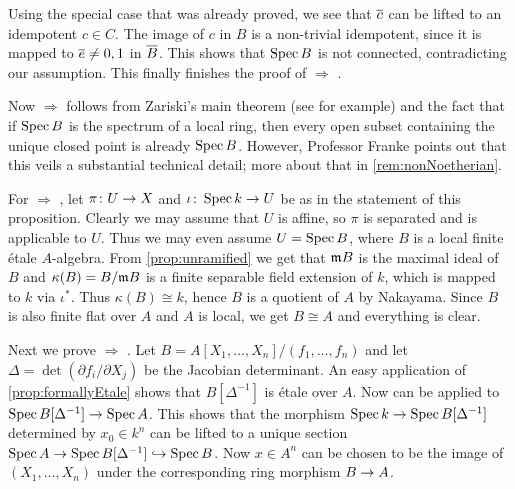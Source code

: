 	Using the special case that was already proved, we see that $\ov{c}$ can be lifted to an idempotent $c\in C$. The image of $c$ in $B$ is a non-trivial idempotent, since it is mapped to $\ov{e}\neq 0,1$ in $\ov{B}$. This shows that $\operatorname{Spec} B$ is not connected, contradicting our assumption. This finally finishes the proof of  $\Rightarrow$ .
	
	Now  $\Rightarrow$  follows from Zariski's main theorem (see \cite[Theorem~2]{jacobians} for example) and the fact that if $\operatorname{Spec} B$ is the spectrum of a local ring, then every open subset containing the unique closed point is already $\operatorname{Spec} B$. However, Professor Franke points out that this  veils a substantial technical detail; more about that in \cref{rem:nonNoetherian}.
	
	For  $\Rightarrow$ , let $\pi\colon U\morphism X$ and $\iota\colon\Spec k\morphism U$ be as in the statement of this proposition. Clearly we may assume that $U$ is affine, so $\pi$ is separated and  is applicable to $U$. Thus we may even assume $U=\operatorname{Spec} B$, where $B$ is a local finite étale $A$-algebra. From \cref{prop:unramified} we get that $\mathfrak{m} B$ is the maximal ideal of $B$ and $\kappa(B)=B/\mathfrak{m} B$ is a finite separable field extension of $k$, which is mapped to $k$ via $\iota^*$. Thus $\kappa(B)\cong k$, hence $B$ is a quotient of $A$ by Nakayama. Since $B$ is also finite flat over $A$ and $A$ is local, we get $B\cong A$ and everything is clear.
	
	Next we prove  $\Rightarrow$ . Let $B=A[X_1,\dotsc,X_n]/(f_1,\dotsc,f_n)$ and let $\Delta=\det(\partial f_i/\partial X_j)$ be the Jacobian determinant. An easy application of \cref{prop:formallyEtale} shows that $B[\Delta^{-1}]$ is étale over $A$. Now  can be applied to $\Spec B[\Delta^{-1}]\morphism \Spec A$. This shows that the morphism $\Spec k\morphism \Spec B[\Delta^{-1}]$ determined by $x_0\in k^n$ can be lifted to a unique section $\Spec A\morphism \Spec B[\Delta^{-1}]\monomorphism \Spec B$. Now $x\in A^n$ can be chosen to be the image of $(X_1,\dotsc,X_n)$ under the corresponding ring morphism $B\morphism A$. 
	
